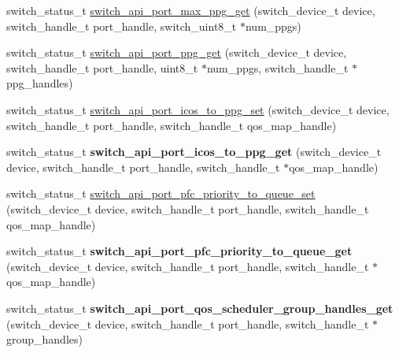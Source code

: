 \begin{DoxyCompactItemize}
\item 
switch\+\_\+status\+\_\+t \hyperlink{group__Port_ga084eb311532471a0cd4d053fbd48c1e1}{switch\+\_\+api\+\_\+port\+\_\+max\+\_\+ppg\+\_\+get} (switch\+\_\+device\+\_\+t device, switch\+\_\+handle\+\_\+t port\+\_\+handle, switch\+\_\+uint8\+\_\+t $\ast$num\+\_\+ppgs)
\item 
switch\+\_\+status\+\_\+t \hyperlink{group__Port_gadad12c0cfe002a89b62a9fcc8ac015cd}{switch\+\_\+api\+\_\+port\+\_\+ppg\+\_\+get} (switch\+\_\+device\+\_\+t device, switch\+\_\+handle\+\_\+t port\+\_\+handle, uint8\+\_\+t $\ast$num\+\_\+ppgs, switch\+\_\+handle\+\_\+t $\ast$ppg\+\_\+handles)
\item 
switch\+\_\+status\+\_\+t \hyperlink{group__Port_ga960c98537f32d8e404efb413ea709ed2}{switch\+\_\+api\+\_\+port\+\_\+icos\+\_\+to\+\_\+ppg\+\_\+set} (switch\+\_\+device\+\_\+t device, switch\+\_\+handle\+\_\+t port\+\_\+handle, switch\+\_\+handle\+\_\+t qos\+\_\+map\+\_\+handle)
\item 
\hypertarget{group__Port_gad1e29493f3f0a32352a967c41d9dbaf5}{switch\+\_\+status\+\_\+t {\bfseries switch\+\_\+api\+\_\+port\+\_\+icos\+\_\+to\+\_\+ppg\+\_\+get} (switch\+\_\+device\+\_\+t device, switch\+\_\+handle\+\_\+t port\+\_\+handle, switch\+\_\+handle\+\_\+t $\ast$qos\+\_\+map\+\_\+handle)}\label{group__Port_gad1e29493f3f0a32352a967c41d9dbaf5}

\item 
switch\+\_\+status\+\_\+t \hyperlink{group__Port_gafc6d663e92b6aa9c1de5bbc5368fd8f1}{switch\+\_\+api\+\_\+port\+\_\+pfc\+\_\+priority\+\_\+to\+\_\+queue\+\_\+set} (switch\+\_\+device\+\_\+t device, switch\+\_\+handle\+\_\+t port\+\_\+handle, switch\+\_\+handle\+\_\+t qos\+\_\+map\+\_\+handle)
\item 
\hypertarget{group__Port_gae523967864dadab632360ca93e0c9a34}{switch\+\_\+status\+\_\+t {\bfseries switch\+\_\+api\+\_\+port\+\_\+pfc\+\_\+priority\+\_\+to\+\_\+queue\+\_\+get} (switch\+\_\+device\+\_\+t device, switch\+\_\+handle\+\_\+t port\+\_\+handle, switch\+\_\+handle\+\_\+t $\ast$qos\+\_\+map\+\_\+handle)}\label{group__Port_gae523967864dadab632360ca93e0c9a34}

\item 
\hypertarget{group__Port_gabec6ea623ed50db4bafe9403606608e2}{switch\+\_\+status\+\_\+t {\bfseries switch\+\_\+api\+\_\+port\+\_\+qos\+\_\+scheduler\+\_\+group\+\_\+handles\+\_\+get} (switch\+\_\+device\+\_\+t device, switch\+\_\+handle\+\_\+t port\+\_\+handle, switch\+\_\+handle\+\_\+t $\ast$group\+\_\+handles)}\label{group__Port_gabec6ea623ed50db4bafe9403606608e2}


\end{DoxyCompactItemize}
